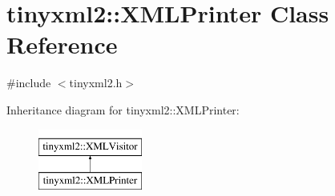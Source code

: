\hypertarget{classtinyxml2_1_1_x_m_l_printer}{\section{tinyxml2\+:\+:X\+M\+L\+Printer Class Reference}
\label{classtinyxml2_1_1_x_m_l_printer}
}


{\ttfamily \#include $<$tinyxml2.\+h$>$}

Inheritance diagram for tinyxml2\+:\+:X\+M\+L\+Printer\+:\begin{figure}[H]
\begin{center}
\leavevmode
\includegraphics[height=2.000000cm]{classtinyxml2_1_1_x_m_l_printer}
\end{center}
\end{figure}
